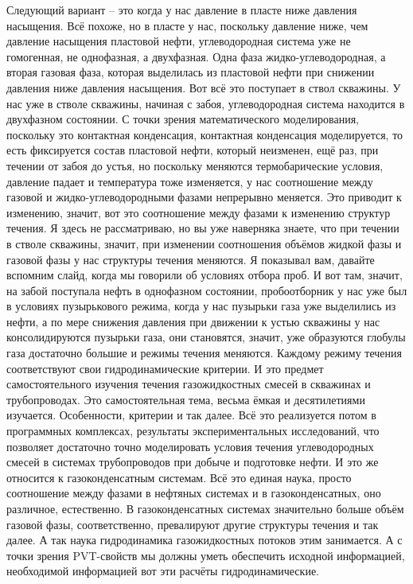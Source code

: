 \documentclass[main.tex]{subfiles}
\begin{document}
Следующий вариант -- это когда у нас давление в пласте ниже давления насыщения.
Всё похоже, но в пласте у нас, поскольку давление ниже, чем давление насыщения пластовой нефти, углеводородная система уже не гомогенная, не однофазная, а двухфазная.
Одна фаза жидко-углеводородная, а вторая газовая фаза, которая выделилась из пластовой нефти при снижении давления ниже давления насыщения.
Вот всё это поступает в ствол скважины.
У нас уже в стволе скважины, начиная с забоя, углеводородная система находится в двухфазном состоянии.
С точки зрения математического моделирования, поскольку это контактная конденсация, контактная конденсация моделируется, то есть фиксируется состав пластовой нефти, который неизменен, ещё раз, при течении от забоя до устья, но поскольку меняются термобарические условия, давление падает и температура тоже изменяется, у нас соотношение между газовой и жидко-углеводородными фазами непрерывно меняется.
Это приводит к изменению, значит, вот это соотношение между фазами к изменению структур течения.
Я здесь не рассматриваю, но вы уже наверняка знаете, что при течении в стволе скважины, значит, при изменении соотношения объёмов жидкой фазы и газовой фазы у нас структуры течения меняются.
Я показывал вам, давайте вспомним слайд, когда мы говорили об условиях отбора проб.
И вот там, значит, на забой поступала нефть в однофазном состоянии, пробоотборник у нас уже был в условиях пузырькового режима, когда у нас пузырьки газа уже выделились из нефти, а по мере снижения давления при движении к устью скважины у нас консолидируются пузырьки газа, они становятся, значит, уже образуются глобулы газа достаточно большие и режимы течения меняются.
Каждому режиму течения соответствуют свои гидродинамические критерии.
И это предмет самостоятельного изучения течения газожидкостных смесей в скважинах и трубопроводах.
Это самостоятельная тема, весьма ёмкая и десятилетиями изучается.
Особенности, критерии и так далее.
Всё это реализуется потом в программных комплексах, результаты экспериментальных исследований, что позволяет достаточно точно моделировать условия течения углеводородных смесей в системах трубопроводов при добыче и подготовке нефти.
И это же относится к газоконденсатным системам.
Всё это единая наука, просто соотношение между фазами в нефтяных системах и в газоконденсатных, оно различное, естественно.
В газоконденсатных системах значительно больше объём газовой фазы, соответственно, превалируют другие структуры течения и так далее.
А так наука гидродинамика газожидкостных потоков этим занимается.
А с точки зрения PVT-свойств мы должны уметь обеспечить исходной информацией, необходимой информацией вот эти расчёты гидродинамические.
\end{document}
